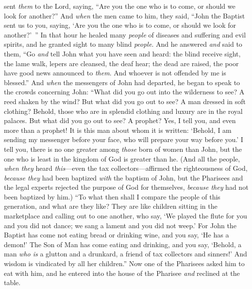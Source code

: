 \begin{biblechapter}
\verse sent \textit{them} to the Lord, saying, “Are you the one who is to come, or should we look for another?”
\verse And \textit{when} the men came to him, they said, “John the Baptist sent us to you, saying, ‘Are you the one who is to come, or should we look for another?’ ”
\verse In that hour he healed many \textit{people} of diseases and suffering and evil spirits, and he granted sight to many blind \textit{people}.
\verse And he answered \textit{and} said to them, “Go \textit{and} tell John what you have seen and heard: the blind receive sight, the lame walk, lepers are cleansed, the deaf hear; the dead are raised, the poor have good news announced to \textit{them}.
\verse And whoever is not offended by me is blessed.”
\verse And \textit{when} the messengers of John had departed, he began to speak to the crowds concerning John: “What did you go out into the wilderness to see? A reed shaken by the wind?
\verse But what did you go out to see? A man dressed in soft clothing? Behold, those who are in splendid clothing and luxury are in the royal palaces.
\verse But what did you go out to see? A prophet? Yes, I tell you, and even more than a prophet!
\verse It is this man about whom it is written: ‘Behold, I am sending my messenger before your face, 
who will prepare your way before you.’
\verse I tell you, there is no one greater among \textit{those} born of women than John, but the one who is least in the kingdom of God is greater than he.
\verse (And all the people, \textit{when they} heard \textit{this}—even the tax collectors—affirmed the righteousness of God, \textit{because they} had been baptized \textit{with} the baptism of John,
\verse but the Pharisees and the legal experts rejected the purpose of God for themselves, \textit{because they} had not been baptized by him.)
\verse “To what then shall I compare the people of this generation, and what are they like?
\verse They are like children sitting in the marketplace and calling out to one another, who say, ‘We played the flute for you and you did not dance; 
we sang a lament and you did not weep.’
\verse For John the Baptist has come not eating bread or drinking wine, and you say, ‘He has a demon!’
\verse The Son of Man has come eating and drinking, and you say, ‘Behold, a man \textit{who is} a glutton and a drunkard, a friend of tax collectors and sinners!’
\verse And wisdom is vindicated by all her children.”
 Now one of the Pharisees asked him to eat with him, and he entered into the house of the Pharisee \textit{and} reclined at the table.

\end{biblechapter}
